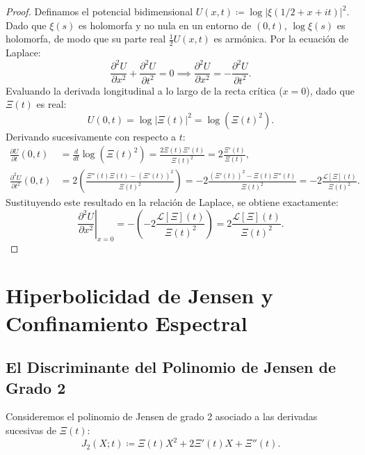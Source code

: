 \documentclass[11pt,a4paper]{article}
\theoremstyle{definition}
\theoremstyle{remark}
\begin{document}
\begin{proof}
Definamos el potencial bidimensional $U(x, t) \coloneqq \log |\xi(1/2 + x + it)|^2$. Dado que $\xi(s)$ es holomorfa y no nula en un entorno de $(0, t)$, $\log \xi(s)$ es holomorfa, de modo que su parte real $\frac{1}{2}U(x, t)$ es armónica. Por la ecuación de Laplace:
\begin{equation}
\frac{\partial^2 U}{\partial x^2} + \frac{\partial^2 U}{\partial t^2} = 0 \implies \frac{\partial^2 U}{\partial x^2} = -\frac{\partial^2 U}{\partial t^2}.
\end{equation}
Evaluando la derivada longitudinal a lo largo de la recta crítica ($x = 0$), dado que $\Xi(t)$ es real:
\begin{equation}
U(0, t) = \log |\Xi(t)|^2 = \log(\Xi(t)^2).
\end{equation}
Derivando sucesivamente con respecto a $t$:
\begin{align}
\frac{\partial U}{\partial t}(0, t) &= \frac{d}{dt}\log(\Xi(t)^2) = \frac{2\Xi(t)\Xi'(t)}{\Xi(t)^2} = 2 \frac{\Xi'(t)}{\Xi(t)}, \\
\frac{\partial^2 U}{\partial t^2}(0, t) &= 2 \left( \frac{\Xi''(t)\Xi(t) - (\Xi'(t))^2}{\Xi(t)^2} \right) = -2 \frac{(\Xi'(t))^2 - \Xi(t)\Xi''(t)}{\Xi(t)^2} = -2 \frac{\mathcal{L}[\Xi](t)}{\Xi(t)^2}.
\end{align}
Sustituyendo este resultado en la relación de Laplace, se obtiene exactamente:
\begin{equation}
\left.\frac{\partial^2 U}{\partial x^2}\right|_{x=0} = -\left( -2 \frac{\mathcal{L}[\Xi](t)}{\Xi(t)^2} \right) = 2 \frac{\mathcal{L}[\Xi](t)}{\Xi(t)^2}.
\end{equation}
\end{proof}

\section{Hiperbolicidad de Jensen y Confinamiento Espectral}

\subsection{El Discriminante del Polinomio de Jensen de Grado 2}

Consideremos el polinomio de Jensen de grado 2 asociado a las derivadas sucesivas de $\Xi(t)$:
\begin{equation}
J_2(X; t) \coloneqq \Xi(t) X^2 + 2\Xi'(t) X + \Xi''(t).
\end{equation}
\end{document}
